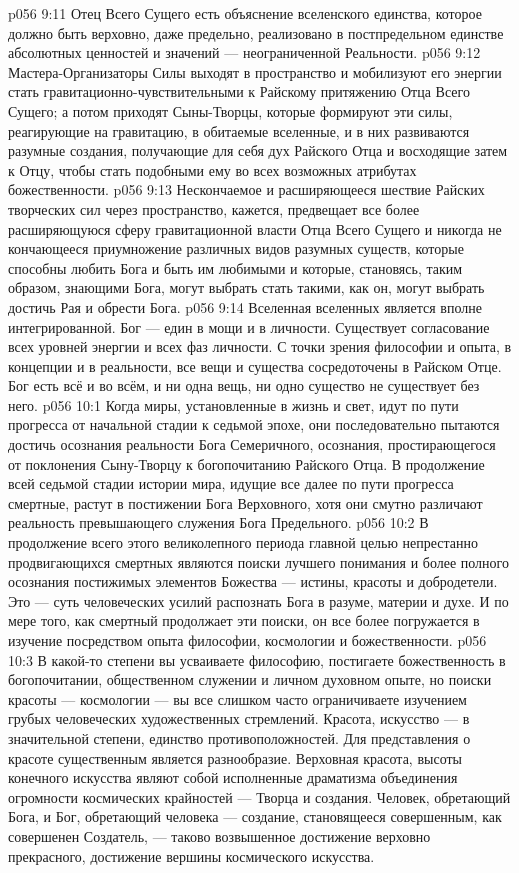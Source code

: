 \vs p056 9:11 Отец Всего Сущего есть объяснение вселенского единства, которое должно быть верховно, даже предельно, реализовано в постпредельном единстве абсолютных ценностей и значений --- неограниченной Реальности.
\vs p056 9:12 Мастера\hyp{}Организаторы Силы выходят в пространство и мобилизуют его энергии стать гравитационно\hyp{}чувствительными к Райскому притяжению Отца Всего Сущего; а потом приходят Сыны\hyp{}Творцы, которые формируют эти силы, реагирующие на гравитацию, в обитаемые вселенные, и в них развиваются разумные создания, получающие для себя дух Райского Отца и восходящие затем к Отцу, чтобы стать подобными ему во всех возможных атрибутах божественности.
\vs p056 9:13 Нескончаемое и расширяющееся шествие Райских творческих сил через пространство, кажется, предвещает все более расширяющуюся сферу гравитационной власти Отца Всего Сущего и никогда не кончающееся приумножение различных видов разумных существ, которые способны любить Бога и быть им любимыми и которые, становясь, таким образом, знающими Бога, могут выбрать стать такими, как он, могут выбрать достичь Рая и обрести Бога.
\vs p056 9:14 Вселенная вселенных является вполне интегрированной. Бог --- един в мощи и в личности. Существует согласование всех уровней энергии и всех фаз личности. С точки зрения философии и опыта, в концепции и в реальности, все вещи и существа сосредоточены в Райском Отце. Бог есть всё и во всём, и ни одна вещь, ни одно существо не существует без него.
\vs p056 10:1 Когда миры, установленные в жизнь и свет, идут по пути прогресса от начальной стадии к седьмой эпохе, они последовательно пытаются достичь осознания реальности Бога Семеричного, осознания, простирающегося от поклонения Сыну\hyp{}Творцу к богопочитанию Райского Отца. В продолжение всей седьмой стадии истории мира, идущие все далее по пути прогресса смертные, растут в постижении Бога Верховного, хотя они смутно различают реальность превышающего служения Бога Предельного.
\vs p056 10:2 В продолжение всего этого великолепного периода главной целью непрестанно продвигающихся смертных являются поиски лучшего понимания и более полного осознания постижимых элементов Божества --- истины, красоты и добродетели. Это --- суть человеческих усилий распознать Бога в разуме, материи и духе. И по мере того, как смертный продолжает эти поиски, он все более погружается в изучение посредством опыта философии, космологии и божественности.
\vs p056 10:3 \pc В какой\hyp{}то степени вы усваиваете философию, постигаете божественность в богопочитании, общественном служении и личном духовном опыте, но поиски красоты --- космологии --- вы все слишком часто ограничиваете изучением грубых человеческих художественных стремлений. Красота, искусство --- в значительной степени, единство противоположностей. Для представления о красоте существенным является разнообразие. Верховная красота, высоты конечного искусства являют собой исполненные драматизма объединения огромности космических крайностей --- Творца и создания. Человек, обретающий Бога, и Бог, обретающий человека --- создание, становящееся совершенным, как совершенен Создатель, --- таково возвышенное достижение верховно прекрасного, достижение вершины космического искусства.
